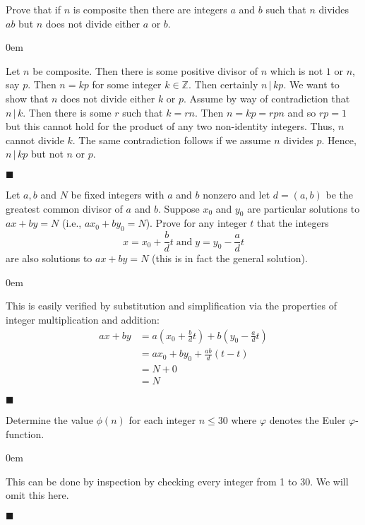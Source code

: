 \documentclass[12pt]{article}
\renewcommand{\qed}{\hfill$\blacksquare$}
\renewenvironment{proof}{\begin{addmargin}[1em]{0em}\begin{newproof}}{\end{newproof}\end{addmargin}\qed}
\newenvironment{problem}[2][Exercise]{\begin{trivlist}
\item[\hskip \labelsep {\bfseries #1}\hskip \labelsep {\bfseries #2.}]}{\end{trivlist}}
\begin{document}
\begin{problem}{0.2.3}
Prove that if $n$ is composite then there are integers $a$ and $b$ such that $n$ divides $ab$ but $n$ does not divide either $a$ or $b$.
\end{problem}
\begin{proof}
Let $n$ be composite. Then there is some positive divisor of $n$ which is not $1$ or $n$, say $p$. Then $n=kp$ for some integer $k\in \mathbb{Z}$. Then certainly $n\,|\,kp$. We want to show that $n$ does not divide either $k$ or $p$. Assume by way of contradiction that $n\,|\,k$. Then there is some $r$ such that $k=rn$. Then $n=kp=rpn$ and so $rp=1$ but this cannot hold for the product of any two non-identity integers. Thus, $n$ cannot divide $k$. The same contradiction follows if we assume $n$ divides $p$. Hence, $n\, | \, kp$ but not $n$ or $p$.
\end{proof}


\begin{problem}{0.2.4}
Let $a,b$ and $N$ be fixed integers with $a$ and $b$ nonzero and let $d=\left(a,b\right)$ be the greatest common divisor of $a$ and $b$. Suppose $x_0$ and $y_0$ are particular solutions to $ax+by=N$ (i.e., $ax_0+by_0=N$). Prove for any integer $t$ that the integers
$$ x=x_0 + \frac{b}{d}t \; \text{and} \; y=y_0-\frac{a}{d}t $$
are also solutions to $ax+by=N$ (this is in fact the general solution).
\end{problem}
\begin{proof}
This is easily verified by substitution and simplification via the properties of integer multiplication and addition:
\begin{equation*}
\begin{split}
ax+by & = a\left(x_0+\frac{b}{d}t\right) + b\left(y_0-\frac{a}{d}t\right) \\
& = ax_0+by_0 + \frac{ab}{d}\left(t-t\right) \\
& = N + 0 \\
& = N
\end{split}
\end{equation*}
\end{proof}


\begin{problem}{0.2.5}
Determine the value $\phi\left(n\right)$ for each integer $n\leq 30$ where $\varphi$ denotes the Euler $\varphi$-function.
\end{problem}
\begin{proof}
This can be done by inspection by checking every integer from 1 to 30. We will omit this here.
\end{proof}
\end{document}
